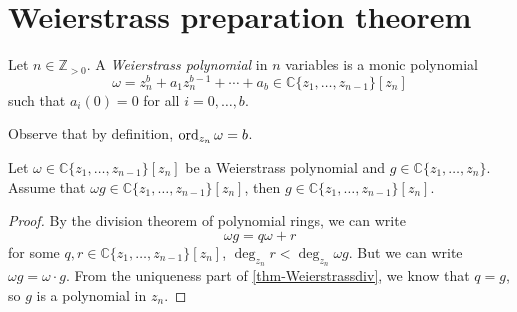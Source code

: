 \section{Weierstrass preparation theorem}

\begin{definition}
    Let $n\in \mathbb{Z}_{>0}$.
    A \emph{Weierstrass polynomial} in $n$ variables is a monic polynomial
    \[
        \omega=z_n^b+a_1z_{n}^{b-1}+\cdots+ a_b\in  \mathbb{C}\{ z_1,\ldots,z_{n-1}\}[z_n] 
    \]
    such that $a_i(0)=0$ for all $i=0,\ldots,b$.
\end{definition}
Observe that by definition, $\operatorname{ord}_{z_n}\omega=b$.

\begin{lemma}\label{lma-Weierstrasspolycancel}
    Let $\omega\in \mathbb{C}\{ z_1,\ldots,z_{n-1}\}[z_n] $ be a Weierstrass polynomial and $g\in \mathbb{C}\{ z_1,\ldots,z_{n}\}$. Assume that $\omega g\in \mathbb{C}\{ z_1,\ldots,z_{n-1}\}[z_n]$, then $g\in \mathbb{C}\{ z_1,\ldots,z_{n-1}\}[z_n]$.
\end{lemma}
\begin{proof}
    By the division theorem of polynomial rings, we can write
    \[
        \omega g = q\omega+r  
    \]
    for some $q,r\in \mathbb{C}\{ z_1,\ldots,z_{n-1}\}[z_n]$, $\deg_{z_n}r<\deg_{z_n}\omega g$. But we can write $\omega g= \omega \cdot g$. From the uniqueness part of \cref{thm-Weierstrassdiv}, we know that $q=g$, so $g$ is a polynomial in $z_n$.
\end{proof}

